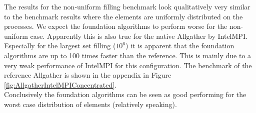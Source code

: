 The results for the non-uniform filling benchmark look qualitatively very similar to the benchmark results where the elements are uniformly distributed on the processes. We expect the foundation algorithms to perform worse for the non-uniform case. Apparently this is also true for the native Allgather by IntelMPI. Especially for the largest set filling ($10^6$) it is apparent that the foundation algorithms are up to 100 times faster than the reference. This is mainly due to a very weak performance of IntelMPI for this configuration. The benchmark of the reference Allgather is shown in the appendix in Figure \ref{fig:AllgatherIntelMPIConcentrated}.\\
Conclusively the foundation algorithms can be seen as good performing for the worst case distribution of elements (relatively speaking).

